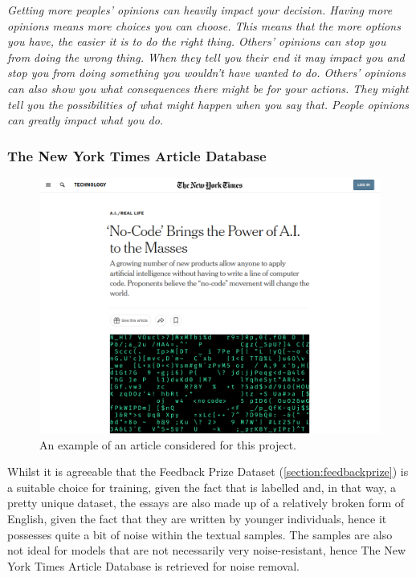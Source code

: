 \documentclass[12pt]{article}
\begin{document}
{\begin{displayquote}
\textit{Getting more peoples' opinions can heavily impact your decision. Having more opinions means more choices you can choose. This means that the more options you have, the easier it is to do the right thing. Others' opinions can stop you from doing the wrong thing. When they tell you their end it may impact you and stop you from doing something you wouldn't have wanted to do. Others' opinions can also show you what consequences there might be for your actions. They might tell you the possibilities of what might happen when you say that. People opinions can greatly impact what you do.}

\end{displayquote}

\subsubsection{The New York Times Article Database}
\label{section:nytimes}

\begin{figure}[!ht]
    \begin{center}
        \includegraphics[scale=0.3]{images/nytimes_example.png}
        \caption{An example of an article considered for this project.}
        \label{fig:nytimes_example}
    \end{center}
\end{figure}

Whilst it is agreeable that the Feedback Prize Dataset (\ref{section:feedbackprize}) is a suitable choice for training, given the fact that is labelled and, in that way, a pretty unique dataset, the essays are also made up of a relatively broken form of English, given the fact that they are written by younger individuals, hence it possesses quite a bit of noise within the textual samples. The samples are also not ideal for models that are not necessarily very noise-resistant, hence The New York Times Article Database is retrieved for noise removal.

}
\end{document}
